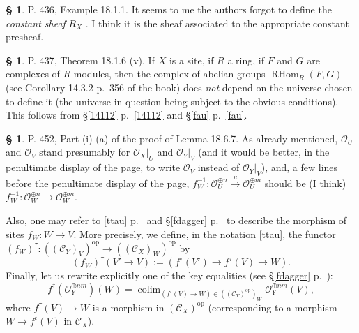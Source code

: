 \documentclass[12pt]{article}%
\theoremstyle{remark}
\theoremstyle{definition}
\newtheorem{s}[thm]{\S}%
\newcommand{\cc}{\mathcal}
\newcommand{\C}{\mathcal C}
\newcommand{\xr}{\xrightarrow}
\DeclareMathOperator*{\colim}{colim}
\DeclareMathOperator{\RHom}{RHom}
\DeclareMathOperator{\op}{op}
\begin{document}
%

\begin{s}%
P. 436, Example 18.1.1. It seems to me the authors forgot to define the {\em constant sheaf}  $R_X$ . I think it is the sheaf associated to the appropriate constant presheaf.
\end{s}

%

\begin{s}
P. 437, Theorem 18.1.6 (v). If $X$ is a site, if $R$ a ring, if $F$ and $G$ are complexes of $R$-modules, then the complex of abelian groups $\RHom_R(F,G)$ (see Corollary 14.3.2 p.~356 of the book) does {\em not} depend on the universe chosen to define it (the universe in question being subject to the obvious conditions). This follows from \S\ref{14112} p.~\ref{14112} and \S\ref{fau} p.~\ref{fau}. 
\end{s}

%

\begin{s}
P. 452, Part (i) (a) of the proof of Lemma 18.6.7. As already mentioned, $\cc O_U$ and $\cc O_V$ stand presumably for $\cc O_X|_U$ and $\cc O_Y|_V$ (and it would be better, in the penultimate display of the page, to write $\cc O_V$ instead of $\cc O_Y|_V$), and, a few lines before the penultimate display of the page, $f_W^{-1}:\cc O_U^{\oplus n}\xr u\cc O_U^{\oplus m}$ should be (I think) $f_W^{-1}:\cc O_W^{\oplus n}\to\cc O_W^{\oplus m}$. 

Also, one may refer to \eqref{ttau} p.~\pageref{ttau} and \S\ref{fdagger} p.~\pageref{fdagger} to describe the morphism of sites $f_W:W\to V$. More precisely, we define, in the notation \eqref{ttau}, the functor $(f_W)^\tau:((\C_Y)_V)^{\op}\to((\C_X)_W)^{\op}$ by
$$
(f_W)^\tau(V'\to V):=(f^\tau(V')\to f^\tau(V)\to W).
$$
Finally, let us rewrite explicitly one of the key equalities (see \S\ref{fdagger} p.~\pageref{fdagger}): 
$$
f^\dagger(\cc O_Y^{\oplus nm})(W)=\colim_{(f^\tau(V)\to W)\in((\C_Y)^{\op})_W}\cc O_Y^{\oplus nm}(V),
$$ 
where $f^\tau(V)\to W$ is a morphism in $(\C_X)^{\op}$ (corresponding to a morphism $W\to f^t(V)$ in $\C_X$).
\end{s}
\printindex
\end{document}
